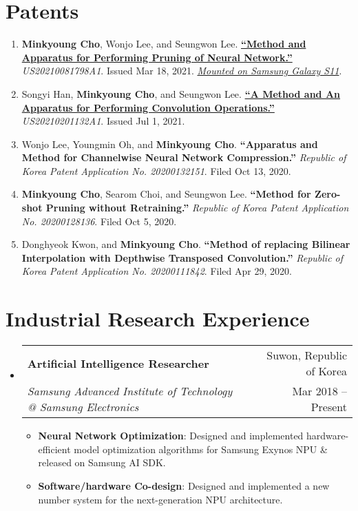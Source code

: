 \documentclass[letterpaper,oneside,11pt]{article}
\makeatletter
\newcommand{\resumeItem}[2]{
  \item\small{
    \textbf{#1}{: #2 \vspace{-2pt}}
  }
}
\newcommand{\resumeSubheading}[4]{
  \vspace{-2pt}\item
    \begin{tabularx}{0.97\textwidth}[t]{X@{\hspace{-5pt}}r}
      \textbf{#1} & #2 \\
      \textit{\small#3} & \small #4 \\
    \end{tabularx}\vspace{-6pt}
}
\newcommand{\resumeSubHeadingListStart}{\begin{itemize}[leftmargin=*]}
\newcommand{\resumeSubHeadingListEnd}{\end{itemize}}
\newcommand{\resumeItemListStart}{\begin{itemize}}
\newcommand{\resumeItemListEnd}{\end{itemize}\vspace{-5pt}}
\makeatother
\begin{document}
\section{Patents}
\begin{enumerate}[leftmargin=*, itemsep=0em]
  \item \small \textbf{Minkyoung Cho}, Wonjo Lee, and Seungwon Lee. \textbf{\href{https://patents.google.com/patent/KR20210032140A/en?inventor=minkyoung+cho&assignee=samsung&oq=minkyoung+cho+samsung}{``Method and Apparatus for Performing Pruning of Neural Network.''}} \textit{US20210081798A1}. Issued Mar 18, 2021. \underline{\textsl{Mounted on Samsung Galaxy S11}}.
  \item \small Songyi Han, \textbf{Minkyoung Cho}, and Seungwon Lee. \textbf{\href{https://patents.google.com/patent/KR20210082970A/en?inventor=minkyoung+cho&assignee=samsung&oq=minkyoung+cho+samsung}{``A Method and An Apparatus for Performing Convolution Operations.''}} \textit{US20210201132A1}. Issued Jul 1, 2021.
  \item \small Wonjo Lee, Youngmin Oh, and \textbf{Minkyoung Cho}. \textbf{``Apparatus and Method for Channelwise Neural Network Compression.''} \textit{Republic of Korea Patent Application No. 20200132151}. Filed Oct 13, 2020.
  \item \small \textbf{Minkyoung Cho}, Searom Choi, and Seungwon Lee. \textbf{``Method for Zero-shot Pruning without Retraining.''} \textit{Republic of Korea Patent Application No. 20200128136}. Filed Oct 5, 2020.
  \item \small Donghyeok Kwon, and \textbf{Minkyoung Cho}. \textbf{``Method of replacing Bilinear Interpolation with Depthwise Transposed Convolution.''} \textit{Republic of Korea Patent Application No. 20200111842}. Filed Apr 29, 2020.
\end{enumerate}

\section{Industrial Research Experience}
\resumeSubHeadingListStart
    \resumeSubheading
      {Artificial Intelligence Researcher}{Suwon, Republic of Korea}
      {Samsung Advanced Institute of Technology @ Samsung Electronics}{Mar 2018 -- Present}
      \resumeItemListStart
        \resumeItem{Neural Network Optimization}{Designed and implemented hardware-efficient model optimization algorithms for Samsung Exynos NPU \& released on Samsung AI SDK.}
        \resumeItem{Software/hardware Co-design}{Designed and implemented a new number system for the next-generation NPU architecture.}
      \resumeItemListEnd
  \resumeSubHeadingListEnd
  
\end{document}
